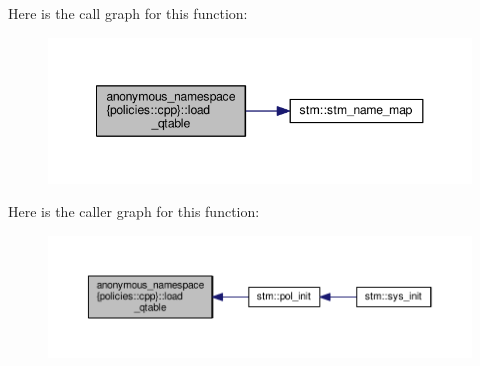 Here is the call graph for this function\-:
\nopagebreak
\begin{figure}[H]
\begin{center}
\leavevmode
\includegraphics[width=348pt]{namespaceanonymous__namespace_02policies_8cpp_03_ae90b562c1daa7c02318148678f1ebea4_cgraph}
\end{center}
\end{figure}




Here is the caller graph for this function\-:
\nopagebreak
\begin{figure}[H]
\begin{center}
\leavevmode
\includegraphics[width=350pt]{namespaceanonymous__namespace_02policies_8cpp_03_ae90b562c1daa7c02318148678f1ebea4_icgraph}
\end{center}
\end{figure}


